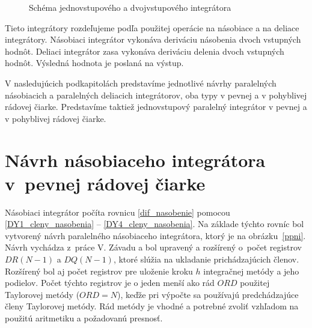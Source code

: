 \begin{figure}[H]
\centering
{} \hspace{1.0cm}
\label{schema_i_ndi}
\caption{Schéma jednovstupového a dvojvstupového integrátora}
\end{figure}

Tieto integrátory rozdeľujeme podľa použitej operácie na násobiace a na deliace integrátory. Násobiaci integrátor vykonáva deriváciu násobenia dvoch vstupných hodnôt. Deliaci integrátor zasa vykonáva deriváciu delenia dvoch vstupných hodnôt. Výsledná hodnota je poslaná na výstup.

V nasledujúcich podkapitolách predstavíme jednotlivé návrhy paralelných násobiacich a paralelných deliacich integrátorov, oba typy v pevnej a v pohyblivej rádovej čiarke. Predstavíme taktiež jednovstupový paralelný integrátor v pevnej a v pohyblivej rádovej čiarke.
\bigskip


\section{Návrh násobiaceho integrátora v~pevnej rádovej čiarke}
Násobiaci integrátor počíta rovnicu \eqref{dif_nasobenie} pomocou \eqref{DY1_cleny_nasobenia} -- \eqref{DY4_cleny_nasobenia}. Na základe týchto rovníc bol vytvorený návrh paralelného násobiaceho integrátora, ktorý je na obrázku~\ref{ppni}. Návrh vychádza z~práce V. Závadu \cite{ZavadaBP} a bol upravený a rozšírený o~počet registrov $ DR(N-1) $ a $ DQ(N-1) $, ktoré slúžia na ukladanie prichádzajúcich členov. Rozšírený bol aj počet registrov pre uloženie kroku $ h $ integračnej metódy a jeho podielov. Počet týchto registrov je o jeden menší ako rád $ ORD $ použitej Taylorovej metódy ($ ORD = N $), keďže pri výpočte sa používajú predchádzajúce členy Taylorovej metódy. Rád metódy je vhodné a potrebné zvoliť vzhľadom na použitú aritmetiku a požadovanú presnosť.

